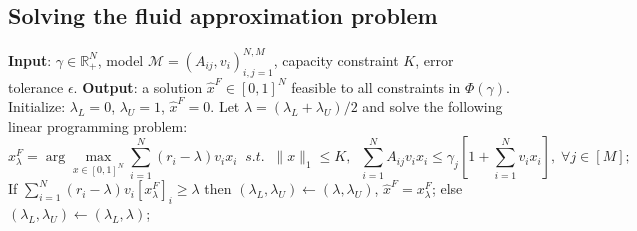 \documentclass[opre]{informs3aa}
\renewcommand{\hat}{\widehat}
\renewcommand{\hat}{\widehat}
\begin{document}

\subsection{Solving the fluid approximation problem}\label{subsec:fluid-solve}

\begin{algorithm}[t]
\caption{Solving the fluid approximation problem}
\label{alg:fluid}
\begin{algorithmic}[1]
\State \textbf{Input}: $\gamma\in\mathbb R_+^N$, model $\mathcal M=(A_{ij},v_i)_{i,j=1}^{N,M}$, capacity constraint $K$, error tolerance $\epsilon$.
\State \textbf{Output}: {a solution $\hat x^F\in[0,1]^N$ feasible to all constraints in $\Phi(\gamma)$.}
\State Initialize: $\lambda_L=0$, $\lambda_U=1$, $\hat x^F=0$.
	\State Let $\lambda = (\lambda_L + \lambda_U)/2$ and solve the following linear programming problem:
	\begin{equation}
	 x_\lambda^F = \arg\max_{x\in[0,1]^N}\sum_{i=1}^N (r_i-\lambda)v_ix_i \;\;s.t.\;\; \|x\|_1\leq K,\;\;\sum_{i=1}^N A_{ij}v_ix_i \leq \gamma_j\left[1+\sum_{i=1}^N v_ix_i\right],\;\forall j\in[M]; 
	\label{eq:lambda-fluid}
	\end{equation}
	\State If $\sum_{i=1}^N (r_i-\lambda)v_i[x_\lambda^F]_i \geq \lambda$ then $(\lambda_L,\lambda_U)\gets (\lambda,\lambda_U)$, $\hat x^F=x_\lambda^F$;
	else $(\lambda_L,\lambda_U)\gets (\lambda_L,\lambda)$;
\EndWhile
\end{algorithmic}
\end{algorithm}
\end{document}
